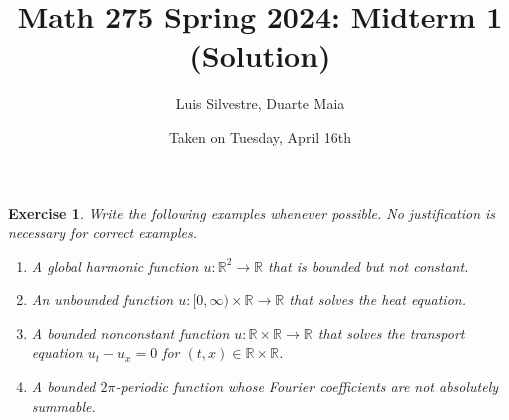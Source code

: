 \documentclass{article}
\title{Math 275 Spring 2024: Midterm 1 (Solution)}
\author{Luis Silvestre, Duarte Maia}
\date{Taken on Tuesday, April 16th}
\newtheorem{ex}{Exercise}
\theoremstyle{nonumberplain}
\newcommand{\R}{\mathbb{R}}
\begin{document}
\maketitle

\begin{ex}
Write the following examples whenever possible. No justification is necessary for correct examples.
\begin{enumerate}
\item A global harmonic function $u \colon \R^2 \to \R$ that is bounded but not constant.
\item An unbounded function $u \colon [0,\infty) \times \R \to \R$ that solves the heat equation.
\item A bounded nonconstant function $u \colon \R \times \R \to \R$ that solves the transport equation $u_t - u_x = 0$ for $(t,x) \in \R \times \R$.
\item A bounded $2\pi$-periodic function whose Fourier coefficients are not absolutely summable.
\end{enumerate}
\end{ex}
\end{document}
